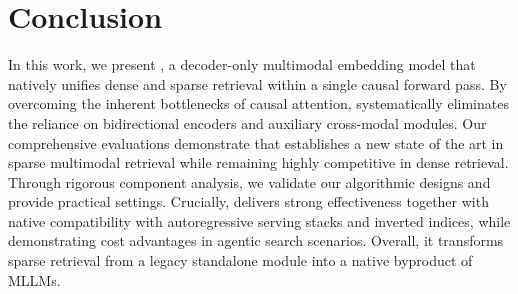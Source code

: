 \section{Conclusion}

In this work, we present \ours, a decoder-only multimodal embedding model that natively unifies dense and sparse retrieval within a single causal forward pass. By overcoming the inherent bottlenecks of causal attention, \ours systematically eliminates the reliance on bidirectional encoders and auxiliary cross-modal modules. Our comprehensive evaluations demonstrate that \ours establishes a new state of the art in sparse multimodal retrieval while remaining highly competitive in dense retrieval. Through rigorous component analysis, we validate our algorithmic designs and provide practical settings. Crucially, \ours delivers strong effectiveness together with native compatibility with autoregressive serving stacks and inverted indices, while demonstrating cost advantages in agentic search scenarios. Overall, it transforms sparse retrieval from a legacy standalone module into a native byproduct of MLLMs.  